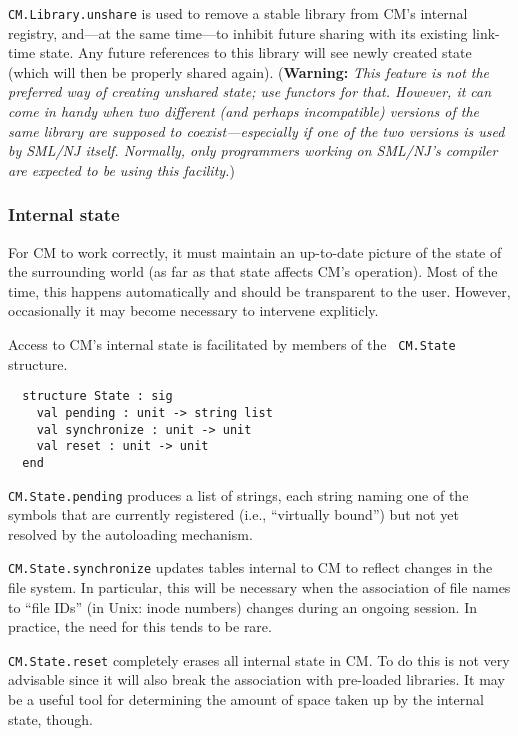 \documentclass[titlepage,letterpaper]{article}
\begin{document}
{\tt CM.Library.unshare} is used to remove a stable library from CM's
internal registry, and---at the same time---to inhibit future sharing
with its existing link-time state.  Any future references to this
library will see newly created state (which will then be properly
shared again).  ({\bf Warning:} {\it This feature is not the preferred
way of creating unshared state; use functors for that.  However, it
can come in handy when two different (and perhaps incompatible)
versions of the same library are supposed to coexist---especially if
one of the two versions is used by SML/NJ itself.  Normally, only
programmers working on SML/NJ's compiler are expected to be using this
facility.})

\subsubsection*{Internal state}

For CM to work correctly, it must maintain an up-to-date picture of
the state of the surrounding world (as far as that state affects CM's
operation).  Most of the time, this happens automatically and should be
transparent to the user.  However, occasionally it may become
necessary to intervene expliticly.

Access to CM's internal state is facilitated by members of the {\tt
CM.State} structure.

\begin{verbatim}
  structure State : sig
    val pending : unit -> string list
    val synchronize : unit -> unit
    val reset : unit -> unit
  end
\end{verbatim}

{\tt CM.State.pending} produces a list of strings, each string naming
one of the symbols that are currently registered (i.e., ``virtually
bound'') but not yet resolved by the autoloading mechanism.

{\tt CM.State.synchronize} updates tables internal to CM to reflect
changes in the file system.  In particular, this will be necessary
when the association of file names to ``file IDs'' (in Unix: inode
numbers) changes during an ongoing session.  In practice, the need for
this tends to be rare.

{\tt CM.State.reset} completely erases all internal state in CM.  To
do this is not very advisable since it will also break the association
with pre-loaded libraries.  It may be a useful tool for determining
the amount of space taken up by the internal state, though.
\end{document}
